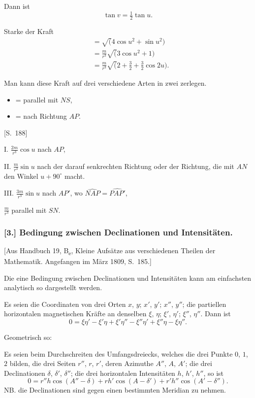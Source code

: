 \documentclass[12pt,a4paper]{article}
\begin{document}
Dann ist
\[
\tan v = \tfrac12 \tan u.
\]

Starke der Kraft
\begin{align*}
&= \surd(4\cos u^2 + \sin u^2) \\
&= \tfrac{m}{r^3} \surd(3\cos u^2 + 1) \\
&= \tfrac{m}{r^3} \surd(2 + \tfrac32 + \tfrac32 \cos 2u).
\end{align*}

Man kann diese Kraft auf drei verschiedene Arten in zwei zerlegen.
\begin{itemize}[leftmargin=2em]
\item[$L$] = parallel mit $NS$,
\item[$S$] = nach Richtung $AP$.
\end{itemize}

[S.~188]

\medskip\noindent
I. $\tfrac{2m}{r^3} \cos u$ nach $AP$,

\medskip\noindent
II. $\tfrac{m}{r^3} \sin u$ nach der darauf senkrechten Richtung oder der Richtung, die mit $AN$ den Winkel $u + 90^\circ$ macht.

\medskip\noindent
III. $\tfrac{3m}{r^3} \sin u$ nach $AP'$, wo $\widehat{NAP} = \widehat{PAP'}$,

$\tfrac{m}{r^3}$ parallel mit $SN$.

\subsubsection*{[3.] Bedingung zwischen Declinationen und Intensit\"aten.}

[Aus Handbuch 19, B\textsubscript{e}, Kleine Aufs\"atze aus verschiedenen Theilen der Mathematik. Angefangen im M\"arz 1809, S.~185.]

Die eine Bedingung zwischen Declinationen und Intensit\"aten kann am einfachsten analytisch so dargestellt werden.

Es seien die Coordinaten von drei Orten $x$, $y$; $x'$, $y'$; $x''$, $y''$; die partiellen horizontalen magnetischen Kr\"afte an denselben $\xi$, $\eta$; $\xi'$, $\eta'$; $\xi''$, $\eta''$. Dann ist
\[
0 = \xi\eta' - \xi'\eta + \xi'\eta'' - \xi''\eta' + \xi''\eta - \xi\eta''.
\]

Geometrisch so:

Es seien beim Durchschreiten des Umfangsdreiecks, welches die drei Punkte $0$, $1$, $2$ bilden, die drei Seiten $r''$, $r$, $r'$, deren Azimuthe $A''$, $A$, $A'$; die drei Declinationen $\delta$, $\delta'$, $\delta''$; die drei horizontalen Intensit\"aten $h$, $h'$, $h''$, so ist
\[
0 = r'' h \cos(A''-\delta) + r h' \cos(A-\delta') + r' h'' \cos(A'-\delta'').
\]
NB. die Declinationen sind gegen einen bestimmten Meridian zu nehmen.
\end{document}

